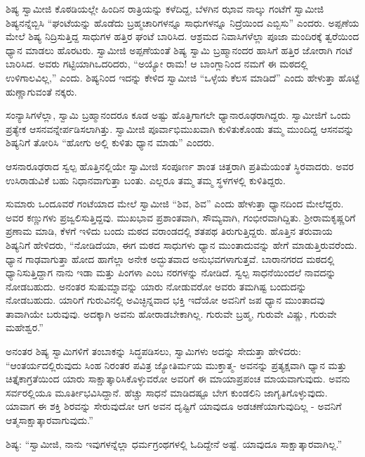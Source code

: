  ಶಿಷ್ಯ ಸ್ವಾಮೀಜಿ ಕೊಠಡಿಯಲ್ಲೇ ಹಿಂದಿನ ರಾತ್ರಿಯನ್ನು ಕಳೆದಿದ್ದ, ಬೆಳಗಿನ ಝಾವ ನಾಲ್ಕು ಗಂಟೆಗೆ ಸ್ವಾಮೀಜಿ ಶಿಷ್ಯನನ್ನೆಬ್ಬಿಸಿ “ಘಂಟೆಯನ್ನು ಹೊಡೆದು ಬ್ರಹ್ಮಚಾರಿಗಳನ್ನೂ ಸಾಧುಗಳನ್ನೂ ನಿದ್ರೆಯಿಂದ ಎಬ್ಬಿಸು” ಎಂದರು. ಅಪ್ಪಣೆಯ ಮೇಲೆ ಶಿಷ್ಯ ನಿದ್ರಿಸುತ್ತಿದ್ದ ಸಾಧುಗಳ ಹತ್ತಿರ ಘಂಟೆ ಬಾರಿಸಿದ. ಆಶ್ರಮದ ನಿವಾಸಿಗಳೆಲ್ಲಾ ಪೂಜಾ ಮಂದಿರಕ್ಕೆ ತ್ವರೆಯಿಂದ ಧ್ಯಾನ ಮಾಡಲು ಹೊರಟರು. ಸ್ವಾಮೀಜಿ ಅಪ್ಪಣೆಯಂತೆ ಶಿಷ್ಯ ಸ್ವಾಮಿ ಬ್ರಹ್ಮಾನಂದರ ಹಾಸಿಗೆ ಹತ್ತಿರ ಜೋರಾಗಿ ಗಂಟೆ ಬಾರಿಸಿದ. ಅವರು ಗಟ್ಟಿಯಾಗಿ\break ಒದರಿದರು, “ಅಯ್ಯೋ ರಾಮ! ಆ ಬಾಂಗ್ಲಾನಿಂದ ನಮಗೆ ಈ ಮಠದಲ್ಲಿ ಉಳಿಗಾಲವಿಲ್ಲ,” ಎಂದು. ಶಿಷ್ಯನಿಂದ ಇದನ್ನು ಕೇಳಿದ ಸ್ವಾಮೀಜಿ “ಒಳ್ಳೆಯ ಕೆಲಸ ಮಾಡಿದೆ” ಎಂದು ಹೇಳುತ್ತಾ ಹೊಟ್ಟೆ ಹುಣ್ಣಾಗುವಂತೆ ನಕ್ಕರು. 

 ಸಂನ್ಯಾಸಿಗಳೆಲ್ಲಾ, ಸ್ವಾಮಿ ಬ್ರಹ್ಮಾನಂದರೂ ಕೂಡ ಅಷ್ಟು ಹೊತ್ತಿಗಾಗಲೇ ಧ್ಯಾನಾರೂಢರಾಗಿದ್ದರು. ಸ್ವಾಮೀಜಿಗೆ ಒಂದು ಪ್ರತ್ಯೇಕ ಆಸನವನ್ನೇರ್ಪಡಿಸಲಾಗಿತ್ತು. ಸ್ವಾಮೀಜಿ ಪೂರ್ವಾಭಿಮುಖವಾಗಿ ಕುಳಿತುಕೊಂಡು ತಮ್ಮ ಮುಂದಿದ್ದ ಆಸನವನ್ನು ಶಿಷ್ಯನಿಗೆ ತೋರಿಸಿ “ಹೋಗು ಅಲ್ಲಿ ಕುಳಿತು ಧ್ಯಾನ ಮಾಡು” ಎಂದರು. 

 ಆಸನಾರೂಢರಾದ ಸ್ವಲ್ಪ ಹೊತ್ತಿನಲ್ಲಿಯೇ ಸ್ವಾಮೀಜಿ ಸಂಪೂರ್ಣ ಶಾಂತ ಚಿತ್ತರಾಗಿ ಪ್ರತಿಮೆಯಂತೆ ಸ್ಥಿರವಾದರು. ಅವರ ಉಸಿರಾಡುವಿಕೆ ಬಹು ನಿಧಾನವಾಗುತ್ತಾ ಬಂತು. ಎಲ್ಲರೂ ತಮ್ಮ ತಮ್ಮ ಸ್ಥಳಗಳಲ್ಲಿ ಕುಳಿತಿದ್ದರು. 

 ಸುಮಾರು ಒಂದೂವರೆ ಗಂಟೆಯಾದ ಮೇಲೆ ಸ್ವಾಮೀಜಿ “ಶಿವ, ಶಿವ” ಎಂದು ಹೇಳುತ್ತಾ ಧ್ಯಾನದಿಂದ ಮೇಲೆದ್ದರು. ಅವರ ಕಣ್ಣುಗಳು ಪ್ರಜ್ವಲಿಸುತ್ತಿದ್ದವು. ಮುಖಭಾವ ಪ್ರಶಾಂತವಾಗಿ, ಸೌಮ್ಯವಾಗಿ, ಗಂಭೀರವಾಗಿದ್ದಿತು. ಶ‍್ರೀರಾಮಕೃಷ್ಣರಿಗೆ ಪ್ರಣಾಮ ಮಾಡಿ, ಕೆಳಗೆ ಇಳಿದು ಬಂದು ಮಠದ ವರಾಂಡದಲ್ಲಿ ಶತಪಥ ತಿರುಗುತ್ತಿದ್ದರು. ಹೊತ್ತಿನ ತರುವಾಯ ಶಿಷ್ಯನಿಗೆ ಹೇಳಿದರು, “ನೋಡಿದೆಯಾ, ಈಗ ಮಠದ ಸಾಧುಗಳು ಧ್ಯಾನ ಮುಂತಾದುವನ್ನು ಹೇಗೆ ಮಾಡುತ್ತಿರುವರೆಂದು. ಧ್ಯಾನ ಗಾಢವಾಗುತ್ತಾ ಹೋದ ಹಾಗೆಲ್ಲಾ ಅನೇಕ ಅದ್ಭುತವಾದ ಅನುಭವಗಳಾಗುತ್ತವೆ. ಬಾರಾನಗರದ ಮಠದಲ್ಲಿ ಧ್ಯಾನಿಸುತ್ತಿದ್ದಾಗ ನಾನು ಇಡಾ ಮತ್ತು ಪಿಂಗಳಾ ಎಂಬ ನರಗಳನ್ನು ನೋಡಿದೆ. ಸ್ವಲ್ಪ ಸಾಧನೆಯಿಂದಲೆ ನಾವದನ್ನು ನೋಡಬಹುದು. ಅನಂತರ ಸುಷುಮ್ನಾವನ್ನು ಯಾರು ನೋಡುವರೋ ಅವರು ತಮಗಿಷ್ಟ ಬಂದುದನ್ನು ನೋಡಬಹುದು. ಯಾರಿಗೆ ಗುರುವಿನಲ್ಲಿ ಅವಿಚ್ಛಿನ್ನವಾದ ಭಕ್ತಿ ಇದೆಯೋ ಅವನಿಗೆ ಜಪ ಧ್ಯಾನ ಮುಂತಾದವು ತಾವಾಗಿಯೇ ಬರುವುವು. ಅದಕ್ಕಾಗಿ ಅವನು ಹೋರಾಡಬೇಕಾಗಿಲ್ಲ. ಗುರುವೇ ಬ್ರಹ್ಮ, ಗುರುವೇ ವಿಷ್ಣು, ಗುರುವೇ ಮಹೇಶ್ವರ.” 

 ಅನಂತರ ಶಿಷ್ಯ ಸ್ವಾಮಿಗಳಿಗೆ ತಂಬಾಕನ್ನು ಸಿದ್ಧಪಡಿಸಲು, ಸ್ವಾಮಿಗಳು ಅದನ್ನು ಸೇದುತ್ತಾ ಹೇಳಿದರು: “ಆಂತರ್ಯದಲ್ಲಿರುವುದು ಸಿಂಹ ನಿರಂತರ ಪವಿತ್ರ ಜ್ಯೋತಿರ್ಮಯ ಮುಕ್ತಾತ್ಮ- ಅವನನ್ನು ಪ್ರತ್ಯಕ್ಷವಾಗಿ ಧ್ಯಾನ ಮತ್ತು ಚಿತ್ತೈಕಾಗ್ರತೆಯಿಂದ ಯಾರು ಸಾಕ್ಷಾತ್ಕಾರಿಸಿಕೊಳ್ಳುವರೋ ಅವರಿಗೆ ಈ ಮಾಯಾಪ್ರಪಂಚ ಮಾಯವಾಗುವುದು. ಅವನು ಸರ್ವರಲ್ಲಿಯೂ ಮೂರ್ತೀಭವಿಸಿದ್ದಾನೆ. ಹೆಚ್ಚು ಸಾಧನೆ ಮಾಡಿದಷ್ಟೂ ಬೇಗ ಕುಂಡಲಿನಿ ಜಾಗೃತಿಗೊಳ್ಳುವುದು. ಯಾವಾಗ ಈ ಶಕ್ತಿ ಶಿರವನ್ನು ಸೇರುವುದೋ ಆಗ ಅವನ ದೃಷ್ಟಿಗೆ ಯಾವುದೂ ಅಡಚಣೆಯಾಗುವುದಿಲ್ಲ - ಅವನಿಗೆ ಆತ್ಮಸಾಕ್ಷಾತ್ಕಾರವಾಗುವುದು.” 

 ಶಿಷ್ಯ: “ಸ್ವಾಮೀಜಿ, ನಾನು ಇವುಗಳನ್ನೆಲ್ಲಾ ಧರ್ಮಗ್ರಂಥಗಳಲ್ಲಿ ಓದಿದ್ದೇನೆ ಅಷ್ಟೆ. ಯಾವುದೂ ಸಾಕ್ಷಾತ್ಕಾರವಾಗಿಲ್ಲ.” 

